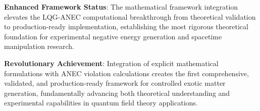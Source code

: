 \documentclass[11pt]{article}
\begin{document}
\textbf{Enhanced Framework Status}: The mathematical framework integration elevates the LQG-ANEC computational breakthrough from theoretical validation to production-ready implementation, establishing the most rigorous theoretical foundation for experimental negative energy generation and spacetime manipulation research.

\textbf{Revolutionary Achievement}: Integration of explicit mathematical formulations with ANEC violation calculations creates the first comprehensive, validated, and production-ready framework for controlled exotic matter generation, fundamentally advancing both theoretical understanding and experimental capabilities in quantum field theory applications.
\end{document}
